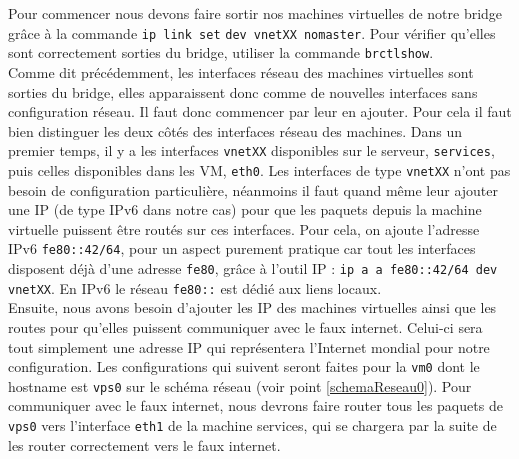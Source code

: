 			Pour commencer nous devons faire sortir nos machines virtuelles de notre bridge grâce à la commande \verb?ip link set? \verb?dev vnetXX nomaster?. Pour vérifier qu'elles sont correctement sorties du bridge, utiliser la commande \verb?brctlshow?.\\

			Comme dit précédemment, les interfaces réseau des machines virtuelles sont sorties du bridge, elles apparaissent donc comme de nouvelles interfaces sans configuration réseau. Il faut donc commencer par leur en ajouter. Pour cela il faut bien distinguer les deux côtés des interfaces réseau des machines. Dans un premier temps, il y a les interfaces \verb?vnetXX? disponibles sur le serveur, \verb?services?, puis celles disponibles dans les VM, \verb?eth0?. Les interfaces de type \verb?vnetXX? n'ont pas besoin de configuration particulière, néanmoins il faut quand même leur ajouter une IP (de type IPv6 dans notre cas) pour que les paquets depuis la machine virtuelle puissent être routés sur ces interfaces. Pour cela, on ajoute l'adresse IPv6 \verb?fe80::42/64?, pour un aspect purement pratique car tout les interfaces disposent déjà d'une adresse \verb?fe80?, grâce à l'outil IP : \verb?ip a a fe80::42/64 dev vnetXX?. En IPv6 le réseau \verb?fe80::? est dédié aux liens locaux.\\


			Ensuite, nous avons besoin d'ajouter les IP des machines virtuelles ainsi que les routes pour qu'elles puissent communiquer avec le faux internet. Celui-ci  sera tout simplement une adresse IP qui représentera l'Internet mondial pour notre configuration. Les configurations qui suivent seront faites pour la \verb?vm0? dont le hostname est \verb?vps0? sur le schéma réseau (voir point \ref{schemaReseau0}). Pour communiquer avec le faux internet, nous devrons faire router tous les paquets de \verb?vps0? vers l'interface \verb?eth1? de la machine services, qui se chargera par la suite de les router correctement vers le faux internet.\\

			\\

